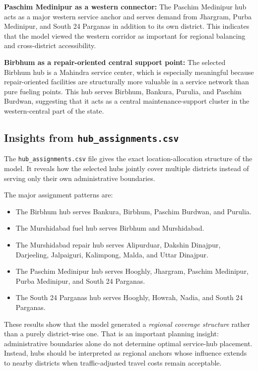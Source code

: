 \textbf{Paschim Medinipur as a western connector:} The Paschim Medinipur hub acts as a major western service anchor and serves demand from Jhargram, Purba Medinipur, and South 24 Parganas in addition to its own district. This indicates that the model viewed the western corridor as important for regional balancing and cross-district accessibility.

\textbf{Birbhum as a repair-oriented central support point:} The selected Birbhum hub is a Mahindra service center, which is especially meaningful because repair-oriented facilities are structurally more valuable in a service network than pure fueling points. This hub serves Birbhum, Bankura, Purulia, and Paschim Burdwan, suggesting that it acts as a central maintenance-support cluster in the western-central part of the state.

\subsection{Insights from \texttt{hub\_assignments.csv}}

The \texttt{hub\_assignments.csv} file gives the exact location-allocation structure of the model. It reveals how the selected hubs jointly cover multiple districts instead of serving only their own administrative boundaries.

The major assignment patterns are:
\begin{itemize}
    \item The Birbhum hub serves Bankura, Birbhum, Paschim Burdwan, and Purulia.
    \item The Murshidabad fuel hub serves Birbhum and Murshidabad.
    \item The Murshidabad repair hub serves Alipurduar, Dakshin Dinajpur, Darjeeling, Jalpaiguri, Kalimpong, Malda, and Uttar Dinajpur.
    \item The Paschim Medinipur hub serves Hooghly, Jhargram, Paschim Medinipur, Purba Medinipur, and South 24 Parganas.
    \item The South 24 Parganas hub serves Hooghly, Howrah, Nadia, and South 24 Parganas.
\end{itemize}

These results show that the model generated a \emph{regional coverage structure} rather than a purely district-wise one. That is an important planning insight: administrative boundaries alone do not determine optimal service-hub placement. Instead, hubs should be interpreted as regional anchors whose influence extends to nearby districts when traffic-adjusted travel costs remain acceptable.

